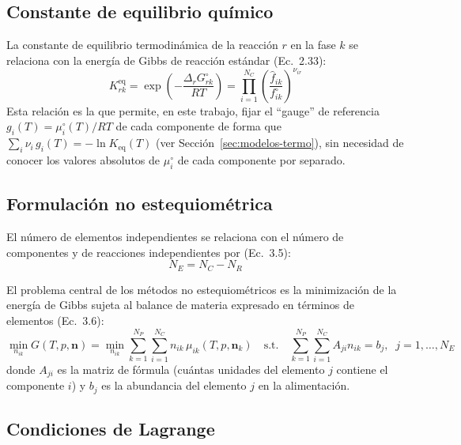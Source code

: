 \documentclass[11pt,a4paper]{article}
\begin{document}
\subsection{Constante de equilibrio químico}

La constante de equilibrio termodinámica de la reacción $r$ en la fase
$k$ se relaciona con la energía de Gibbs de reacción estándar
(Ec.~2.33):
\begin{equation}
  K_{rk}^{\text{eq}} = \exp\!\left(-\frac{\Delta_r G_{rk}^{\circ}}{RT}\right)
  = \prod_{i=1}^{N_C}\left(\frac{\hat f_{ik}}{f_{ik}^{\circ}}\right)^{\nu_{ir}}
  \label{eq:2.33}
\end{equation}
Esta relación es la que permite, en este trabajo, fijar el
``gauge'' de referencia $g_i(T)=\mu_i^{\circ}(T)/RT$ de cada componente
de forma que $\sum_i \nu_i\, g_i(T) = -\ln K_{\text{eq}}(T)$ (ver
Sección~\ref{sec:modelos-termo}), sin necesidad de conocer los valores
absolutos de $\mu_i^{\circ}$ de cada componente por separado.

\subsection{Formulación no estequiométrica}

El número de elementos independientes se relaciona con el número de
componentes y de reacciones independientes por (Ec.~3.5):
\begin{equation}
  N_E = N_C - N_R
  \label{eq:3.5}
\end{equation}

El problema central de los métodos no estequiométricos es la
minimización de la energía de Gibbs sujeta al balance de materia
expresado en términos de elementos (Ec.~3.6):
\begin{equation}
  \min_{n_{ik}} G(T,p,\mathbf{n}) = \min_{n_{ik}} \sum_{k=1}^{N_P}\sum_{i=1}^{N_C} n_{ik}\,\mu_{ik}(T,p,\mathbf{n}_k)
  \quad\text{s.t.}\quad
  \sum_{k=1}^{N_P}\sum_{i=1}^{N_C} A_{ji} n_{ik} = b_j,\;\; j=1,\dots,N_E
  \label{eq:3.6}
\end{equation}
donde $A_{ji}$ es la matriz de fórmula (cuántas unidades del elemento
$j$ contiene el componente $i$) y $b_j$ es la abundancia del elemento
$j$ en la alimentación.

\subsection{Condiciones de Lagrange}
\end{document}
